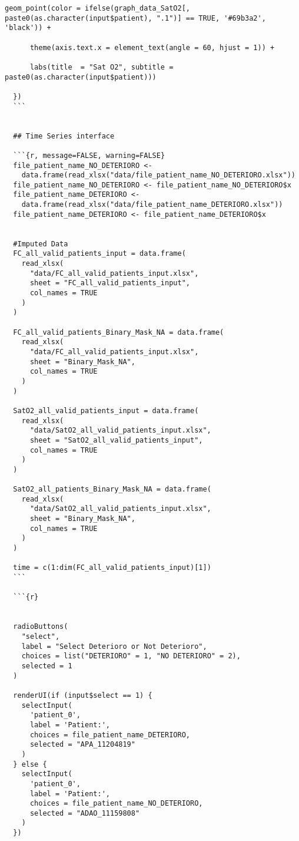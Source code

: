 \begin{lstlisting}[style=mystyle2,caption={Código Visualización de los Datos}, label={lst:codigo-visualizacion}]
      geom_point(color = ifelse(graph_data_SatO2[, paste0(as.character(input$patient), ".1")] == TRUE, '#69b3a2', 'black')) +
      
      theme(axis.text.x = element_text(angle = 60, hjust = 1)) +
      
      labs(title  = "Sat O2", subtitle = paste0(as.character(input$patient)))
    
  })
  ```
  
  
  ## Time Series interface
  
  ```{r, message=FALSE, warning=FALSE}
  file_patient_name_NO_DETERIORO <-
    data.frame(read_xlsx("data/file_patient_name_NO_DETERIORO.xlsx"))
  file_patient_name_NO_DETERIORO <- file_patient_name_NO_DETERIORO$x
  file_patient_name_DETERIORO <-
    data.frame(read_xlsx("data/file_patient_name_DETERIORO.xlsx"))
  file_patient_name_DETERIORO <- file_patient_name_DETERIORO$x
  
  
  #Imputed Data
  FC_all_valid_patients_input = data.frame(
    read_xlsx(
      "data/FC_all_valid_patients_input.xlsx",
      sheet = "FC_all_valid_patients_input",
      col_names = TRUE
    )
  )
  
  FC_all_valid_patients_Binary_Mask_NA = data.frame(
    read_xlsx(
      "data/FC_all_valid_patients_input.xlsx",
      sheet = "Binary_Mask_NA",
      col_names = TRUE
    )
  )
  
  SatO2_all_valid_patients_input = data.frame(
    read_xlsx(
      "data/SatO2_all_valid_patients_input.xlsx",
      sheet = "SatO2_all_valid_patients_input",
      col_names = TRUE
    )
  )
  
  SatO2_all_patients_Binary_Mask_NA = data.frame(
    read_xlsx(
      "data/SatO2_all_valid_patients_input.xlsx",
      sheet = "Binary_Mask_NA",
      col_names = TRUE
    )
  )
  
  time = c(1:dim(FC_all_valid_patients_input)[1])
  ```
  
  ```{r}
  
  
  radioButtons(
    "select",
    label = "Select Deterioro or Not Deterioro",
    choices = list("DETERIORO" = 1, "NO DETERIORO" = 2),
    selected = 1
  )
  
  renderUI(if (input$select == 1) {
    selectInput(
      'patient_0',
      label = 'Patient:',
      choices = file_patient_name_DETERIORO,
      selected = "APA_11204819"
    )
  } else {
    selectInput(
      'patient_0',
      label = 'Patient:',
      choices = file_patient_name_NO_DETERIORO,
      selected = "ADAO_11159808"
    )
  })
  

\end{lstlisting}

